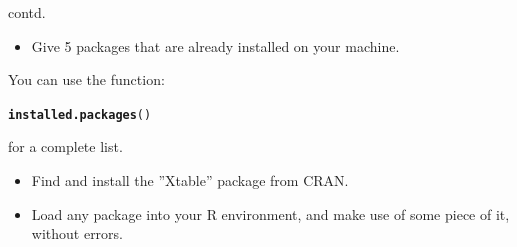 \documentclass{beamer}\usepackage[]{graphicx}\usepackage[]{color}
\makeatletter
\newcommand{\hlstd}[1]{\textcolor[rgb]{0.345,0.345,0.345}{#1}}%
\newcommand{\hlkwd}[1]{\textcolor[rgb]{0.737,0.353,0.396}{\textbf{#1}}}%
\newenvironment{kframe}{%
 \def\at@end@of@kframe{}%
 \ifinner\ifhmode%
  \def\at@end@of@kframe{\end{minipage}}%
  \begin{minipage}{\columnwidth}%
 \fi\fi%
 \def\FrameCommand##1{\hskip\@totalleftmargin \hskip-\fboxsep
 \colorbox{shadecolor}{##1}\hskip-\fboxsep
     \hskip-\linewidth \hskip-\@totalleftmargin \hskip\columnwidth}%
 \MakeFramed {\advance\hsize-\width
   \@totalleftmargin\z@ \linewidth\hsize
   \@setminipage}}%
 {\par\unskip\endMakeFramed%
 \at@end@of@kframe}
\newenvironment{knitrout}{}{} %
\makeatother
\begin{document}
\begin{frame}[fragile]{contd.}

\begin{itemize}
\item Give 5 packages that are already installed on your machine.
\end{itemize}
You can use the function:
\begin{knitrout}
\color{fgcolor}\begin{kframe}
\begin{alltt}
\hlkwd{installed.packages}\hlstd{()}
\end{alltt}
\end{kframe}
\end{knitrout}
for a complete list.

\begin{itemize}
\item Find and install the ”Xtable” package from CRAN.
\end{itemize}

\begin{itemize}
\item Load any package into your R environment, and make use of some piece of it, without errors.
\end{itemize}

\end{frame}
\end{document}
